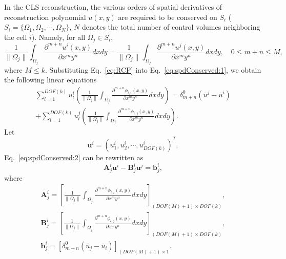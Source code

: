 \documentclass[review]{elsarticle}
\begin{document}
In the CLS reconstruction, the various orders of spatial derivatives of reconstruction polynomial $u(x,y)$ are required to be conserved on $S_i$ ($S_i=\{\Omega_1, \Omega_2, \cdots, \Omega_N\}$, $N$ denotes the total number of control volumes neighboring the cell $i$). Namely, for all $\Omega_j \in S_i$,
\begin{equation}\label{eq:spdConserved:1}
	\frac{1}{\|\Omega_j\|}\int_{\Omega_j}\frac{\partial^{m+n}u^i(x,y)}{\partial x^my^n}dxdy=\frac{1}{\|\Omega_j\|}\int_{\Omega_j}\frac{\partial^{m+n}u^j(x,y)}{\partial x^my^n}dxdy, \quad 0\leq m+n \leq M,
\end{equation}
where $M \leq k$. Substituting Eq.~\eqref{eq:RCP} into Eq.~\eqref{eq:spdConserved:1}, we obtain the following linear equations
\begin{equation}\label{eq:spdConserved:2}
	\begin{gathered}
		\sum_{l=1}^{DOF(k)}u^i_l\left(\frac{1}{\|\Omega_j\|}\int_{\Omega_j}\frac{\partial^{m+n}\phi_{l,i}(x,y)}{\partial x^my^n}dxdy\right)
		=\delta^0_{m+n}\left(\overline{u}^j-\overline{u}^i\right)\\
		+\sum_{l=1}^{DOF(k)}u^j_l\left(\frac{1}{\|\Omega_j\|}\int_{\Omega_j}\frac{\partial^{m+n}\phi_{l,j}(x,y)}{\partial x^my^n}dxdy\right).
	\end{gathered}
\end{equation}
Let
\begin{equation}\label{eq:u_i}
	\bm{u}^i=\left(u^i_1, u^i_2, \cdots ,u^i_{DOF(k)}\right)^T,
\end{equation}
Eq.~\eqref{eq:spdConserved:2} can be rewritten as
\begin{equation}\label{eq:spdConserved:3}
	\bm{A}^i_j\bm{u}^i-\bm{B}^i_j\bm{u}^j=\bm{b}^i_j,
\end{equation}
where
\begin{equation}\label{eq:A:B:b}
	\begin{gathered}
	\bm{A}^i_j=\left[\frac{1}{\|\Omega_j\|}\int_{\Omega_j}\frac{\partial^{m+n}\phi_{l,i}(x,y)}
		{\partial x^my^n}dxdy\right]_{(DOF(M)+1) \times DOF(k)},\\
	\bm{B}^i_j=\left[\frac{1}{\|\Omega_j\|}\int_{\Omega_j}\frac{\partial^{m+n}\phi_{l,j}(x,y)}
		{\partial x^my^n}dxdy\right]_{(DOF(M)+1) \times DOF(k)},\\
	\bm{b}^i_j=\left[\delta^0_{m+n}\left(\overline{u}_j-\overline{u}_i\right)\right]_{(DOF(M)+1) \times 1}.
	\end{gathered}
\end{equation}
\end{document}
